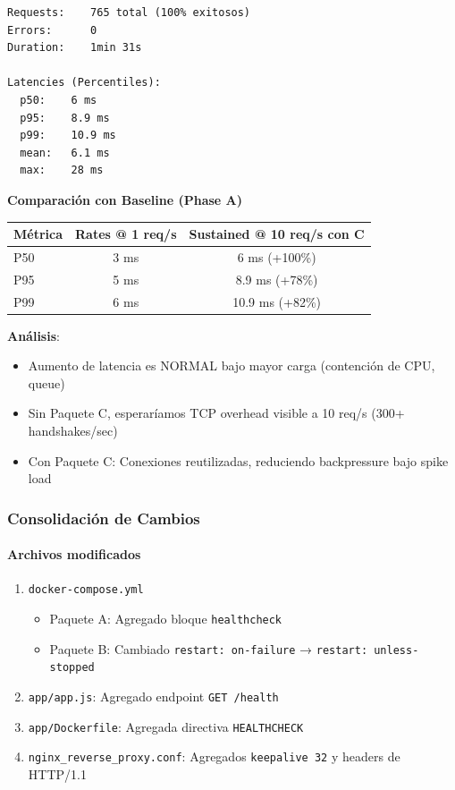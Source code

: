 \begin{verbatim}
Requests:    765 total (100% exitosos)
Errors:      0
Duration:    1min 31s

Latencies (Percentiles):
  p50:    6 ms
  p95:    8.9 ms
  p99:    10.9 ms
  mean:   6.1 ms
  max:    28 ms
\end{verbatim}

\textbf{Comparación con Baseline (Phase A)}

\begin{table}[H]
\centering
\begin{tabular}{lcc}
\toprule
\textbf{Métrica} & \textbf{Rates @ 1 req/s} & \textbf{Sustained @ 10 req/s con C} \\
\midrule
P50 & 3 ms & 6 ms (+100\%) \\
P95 & 5 ms & 8.9 ms (+78\%) \\
P99 & 6 ms & 10.9 ms (+82\%) \\
\bottomrule
\end{tabular}
\end{table}

\textbf{Análisis}:
\begin{itemize}[leftmargin=*]
    \item Aumento de latencia es NORMAL bajo mayor carga (contención de CPU, queue)
    \item Sin Paquete C, esperaríamos TCP overhead visible a 10 req/s (300+ handshakes/sec)
    \item Con Paquete C: Conexiones reutilizadas, reduciendo backpressure bajo spike load
\end{itemize}

\subsubsection{Consolidación de Cambios}

\paragraph{Archivos modificados}
\begin{enumerate}[leftmargin=*]
    \item \texttt{docker-compose.yml}
        \begin{itemize}
            \item Paquete A: Agregado bloque \texttt{healthcheck}
            \item Paquete B: Cambiado \texttt{restart: on-failure} → \texttt{restart: unless-stopped}
        \end{itemize}
    \item \texttt{app/app.js}: Agregado endpoint \texttt{GET /health}
    \item \texttt{app/Dockerfile}: Agregada directiva \texttt{HEALTHCHECK}
    \item \texttt{nginx\_reverse\_proxy.conf}: Agregados \texttt{keepalive 32} y headers de HTTP/1.1
\end{enumerate}

